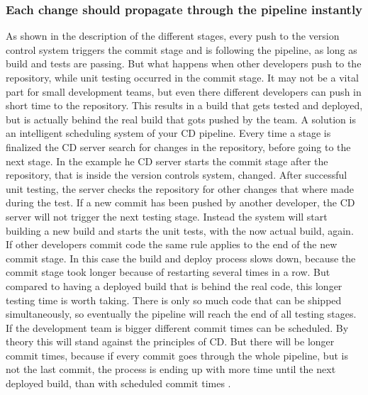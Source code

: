 \subsubsection{Each change should propagate through the pipeline instantly}
As shown in the description of the different stages, every push to the version control system triggers the commit stage and is following the pipeline, as long as
build and tests are passing. But what happens when other developers push to the repository, while unit testing occurred in the commit stage. It may not be a vital
part for small development teams, but even there different developers can push in short time to the repository. This results
in a build that gets tested and deployed, but is actually behind the real build that gots pushed by the team. A solution is an intelligent scheduling
system of your CD pipeline. Every time a stage is finalized the CD server search for changes in the repository, before going to the next stage. In the
example he CD server starts the commit stage after the repository, that is inside the version controls system, changed. After successful unit
testing, the server checks the repository for other changes that where made during the test. If a new commit has been pushed by another developer,
the CD server will not trigger the next testing stage. Instead the system will start building a new build and starts the unit tests, with the now actual build, again.
If other developers commit code the same rule applies to the end of the new commit stage. In this case the build and deploy process slows down, because the commit stage
took longer because of restarting several times in a row. But compared to having a deployed build that is behind the real code, this longer testing time is worth taking.
There is only so much code that can be shipped simultaneously, so eventually the pipeline will reach the end of all testing stages. If the development team is bigger
different commit times can be scheduled. By theory this will stand against the principles of CD. But there will be longer commit times, because if every commit goes through
the whole pipeline, but is not the last commit, the process is ending up with more time until the next deployed build, than with scheduled commit times .

